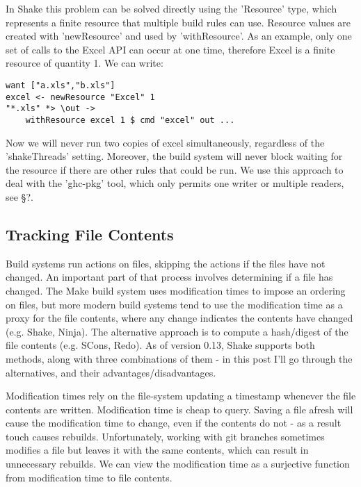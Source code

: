 In Shake this problem can be solved directly using the \lst'Resource' type, which represents a finite resource that multiple build rules can use. Resource values are created with \lst'newResource' and used by \lst'withResource'. As an example, only one set of calls to the Excel API can occur at one time, therefore Excel is a finite resource of quantity 1. We can write:

\begin{lstlisting}
want ["a.xls","b.xls"]
excel <- newResource "Excel" 1
"*.xls" *> \out ->
    withResource excel 1 $ cmd "excel" out ...
\end{lstlisting}

Now we will never run two copies of excel simultaneously, regardless of the \lst'shakeThreads' setting. Moreover, the build system will never block waiting for the resource if there are other rules that could be run. We use this approach to deal with the \lst'ghc-pkg' tool, which only permits one writer or multiple readers, see \S?.

\subsection{Tracking File Contents\label{sec:file-contents}}

Build systems run actions on files, skipping the actions if the files have not changed. An important part of that process involves determining if a file has changed. The Make build system uses modification times to impose an ordering on files, but more modern build systems tend to use the modification time as a proxy for the file contents, where any change indicates the contents have changed (e.g. Shake, Ninja). The alternative approach is to compute a hash/digest of the file contents (e.g. SCons, Redo). As of version 0.13, Shake supports both methods, along with three combinations of them - in this post I'll go through the alternatives, and their advantages/disadvantages.

Modification times rely on the file-system updating a timestamp whenever the file contents are written. Modification time is cheap to query. Saving a file afresh will cause the modification time to change, even if the contents do not - as a result touch causes rebuilds. Unfortunately, working with git branches sometimes modifies a file but leaves it with the same contents, which can result in unnecessary rebuilds. We can view the modification time as a surjective function from modification time to file contents.

